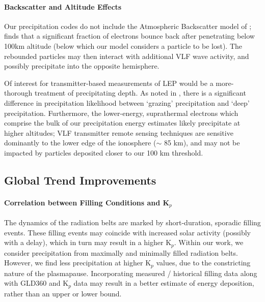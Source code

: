 \paragraph{Backscatter and Altitude Effects}
Our precipitation codes do not include the Atmospheric Backscatter model of \cite{Cotts2011}; \citeauthor{Cotts2011} finds that a significant fraction of electrons bounce back after penetrating below 100km altitude (below which our model considers a particle to be lost). The rebounded particles may then interact with additional VLF wave activity, and possibly precipitate into the opposite hemisphere.

Of interest for transmitter-based measurements of LEP would be a more-thorough treatment of precipitating depth. As noted in \cite{Cotts2011}, there is a significant difference in precipitation likelihood between `grazing' precipitation and `deep' precipitation. Furthermore, the lower-energy, suprathermal electrons which comprise the bulk of our precipitation energy estimates likely precipitate at higher altitudes; VLF transmitter remote sensing techniques are sensitive dominantly to the lower edge of the ionosphere ($\sim$ 85 km), and may not be impacted by particles deposited closer to our 100 km threshold.

\subsection{Global Trend Improvements}
\paragraph{Correlation between Filling Conditions and K$_p$}
The dynamics of the radiation belts are marked by short-duration, sporadic filling events. These filling events may coincide with increased solar activity (possibly with a delay), which in turn may result in a higher K$_p$. Within our work, we consider precipitation from maximally and minimally filled radiation belts. However, we find less precipitation at higher K$_p$ values, due to the constricting nature of the plasmapause. Incorporating measured / historical filling data along with GLD360 and K$_p$ data may result in a better estimate of energy deposition, rather than an upper or lower bound.

